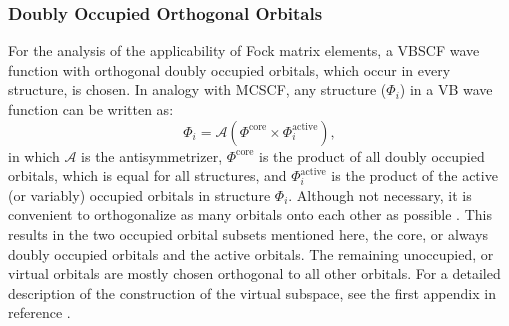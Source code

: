 \subsubsection{Doubly Occupied Orthogonal Orbitals}

For the analysis of the applicability of Fock matrix elements, a VBSCF wave function with orthogonal doubly occupied orbitals, which occur in every structure, is chosen. In analogy with MCSCF, any structure ($\Phi_i$) in a VB wave function can be written as:
\begin{equation}
\Phi_i = \mathcal{A}(\Phi^{\mathrm{core}} \times \Phi_i^{\mathrm{active}}),
\label{ch2.eq.wfsplit}
\end{equation}
in which $\mathcal{A}$ is the antisymmetrizer, $\Phi^{\mathrm{core}}$ is the product of all doubly occupied orbitals, which is equal for all structures, and $\Phi_i^{\mathrm{active}}$ is the product of the active (or variably) occupied orbitals in structure $\Phi_i$. Although not necessary, it is convenient to orthogonalize as many orbitals onto each other as possible \cite{vbscf2}. This results in the two occupied orbital subsets mentioned here, the core, or always doubly occupied orbitals and the active orbitals. The remaining unoccupied, or virtual orbitals are mostly chosen orthogonal to all other orbitals. For a detailed description of the construction of the virtual subspace, see the first appendix in reference \cite{koos1}.

